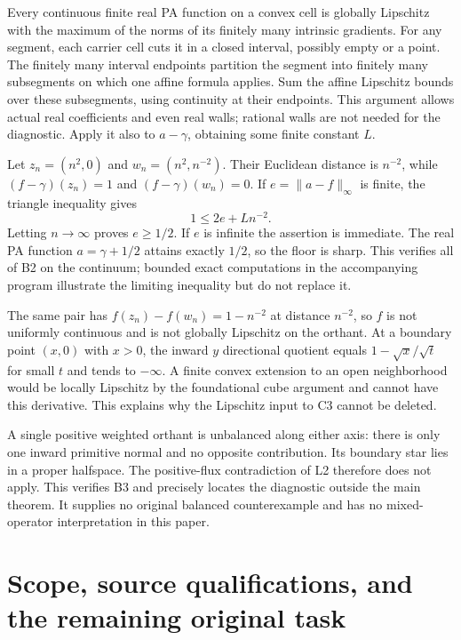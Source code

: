 \documentclass[
  11pt,
]{article}
\begin{document}
Every continuous finite real PA function on a convex cell is globally
Lipschitz with the maximum of the norms of its finitely many intrinsic
gradients. For any segment, each carrier cell cuts it in a closed
interval, possibly empty or a point. The finitely many interval
endpoints partition the segment into finitely many subsegments on which
one affine formula applies. Sum the affine Lipschitz bounds over these
subsegments, using continuity at their endpoints. This argument allows
actual real coefficients and even real walls; rational walls are not
needed for the diagnostic. Apply it also to \(a-\gamma\), obtaining some
finite constant \(L\).

Let \(z_n=(n^2,0)\) and \(w_n=(n^2,n^{-2})\). Their Euclidean distance
is \(n^{-2}\), while \((f-\gamma)(z_n)=1\) and \((f-\gamma)(w_n)=0\). If
\(e=\|a-f\|_\infty\) is finite, the triangle inequality gives
\[ 1\leq2e+L n^{-2}. \] Letting \(n\to\infty\) proves \(e\geq1/2\). If
\(e\) is infinite the assertion is immediate. The real PA function
\(a=\gamma+1/2\) attains exactly \(1/2\), so the floor is sharp. This
verifies all of B2 on the continuum; bounded exact computations in the
accompanying program illustrate the limiting inequality but do not
replace it.

The same pair has \(f(z_n)-f(w_n)=1-n^{-2}\) at distance \(n^{-2}\), so
\(f\) is not uniformly continuous and is not globally Lipschitz on the
orthant. At a boundary point \((x,0)\) with \(x>0\), the inward \(y\)
directional quotient equals \(1-\sqrt{x}/\sqrt t\) for small \(t\) and
tends to \(-\infty\). A finite convex extension to an open neighborhood
would be locally Lipschitz by the foundational cube argument and cannot
have this derivative. This explains why the Lipschitz input to C3 cannot
be deleted.

A single positive weighted orthant is unbalanced along either axis:
there is only one inward primitive normal and no opposite contribution.
Its boundary star lies in a proper halfspace. The positive-flux
contradiction of L2 therefore does not apply. This verifies B3 and
precisely locates the diagnostic outside the main theorem. It supplies
no original balanced counterexample and has no mixed-operator
interpretation in this paper.

\section{Scope, source qualifications, and the remaining original
task}\label{scope-source-qualifications-and-the-remaining-original-task}
\end{document}
